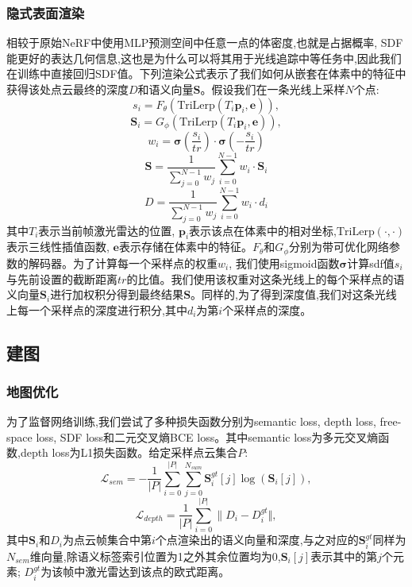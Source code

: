 \subsubsection{隐式表面渲染}
相较于原始NeRF中使用MLP预测空间中任意一点的体密度,也就是占据概率, SDF能更好的表达几何信息,这也是为什么可以将其用于光线追踪中等任务中,因此我们在训练中直接回归SDF值。下列渲染公式表示了我们如何从嵌套在体素中的特征中获得该处点云最终的深度$D$和语义向量$\mathbf{S}$。假设我们在一条光线上采样$N$个点:
\begin{equation}
    s_i=F_\theta(\mbox{TriLerp}(T_i\mathbf{p}_i,\mathbf{e})),
\end{equation}
\begin{equation}
    \mathbf{S}_i=G_\phi(\mbox{TriLerp}(T_i\mathbf{p}_i,\mathbf{e})),
\end{equation}
\begin{equation}
    w_i=\mathbf{\sigma}(\frac{s_i}{tr})\cdot\mathbf{\sigma}(-\frac{s_i}{tr})
\end{equation}
\begin{equation}
    \mathbf{S} = \frac{1}{\sum_{j=0}^{N-1}w_j}\sum_{i=0}^{N-1}w_i\cdot\mathbf{S}_i
\end{equation}
\begin{equation}
    D = \frac{1}{\sum_{j=0}^{N-1}w_j}\sum_{i=0}^{N-1}w_i\cdot d_i
\end{equation}
其中$T_i$表示当前帧激光雷达的位置, $\mathbf{p}_i$表示该点在体素中的相对坐标,$\mbox{TriLerp}(\cdot , \cdot)$表示三线性插值函数, $\mathbf{e}$表示存储在体素中的特征。$F_\theta\mbox{和}G_\phi$分别为带可优化网络参数的解码器。为了计算每一个采样点的权重$w_i$, 我们使用sigmoid函数$\mathbf{\sigma}$计算sdf值$s_i$与先前设置的截断距离$tr$的比值。我们使用该权重对这条光线上的每个采样点的语义向量$\mathbf{S}_i$进行加权积分得到最终结果$\mathbf{S}$。同样的,为了得到深度值,我们对这条光线上每一个采样点的深度进行积分,其中$d_i$为第$i$个采样点的深度。
\subsection{建图}
\subsubsection{地图优化}
为了监督网络训练,我们尝试了多种损失函数分别为semantic loss, depth loss, free-space loss, SDF loss和二元交叉熵BCE loss。其中semantic loss为多元交叉熵函数,depth loss为L1损失函数。给定采样点云集合$P$:
\begin{equation}
    \mathcal{L}_{sem} = -\frac{1}{|P|}\sum_{i=0}^{|P|}\sum_{j=0}^{N_{sum}}\mathbf{S}_i^{gt}[j]\log(\mathbf{S}_i[j]),
\end{equation}
\begin{equation}
    \mathcal{L}_{depth} = \frac{1}{|P|}\sum_{i=0}^{|P|}\| D_i-D_i^{gt}\Vert ,
\end{equation}
其中$\mathbf{S}_i$和$D_i$为点云帧集合中第$i$个点渲染出的语义向量和深度,与之对应的$\mathbf{S}_i^{gt}$同样为$N_{sem}$维向量,除语义标签索引位置为1之外其余位置均为0,$\mathbf{S}_i[j]$表示其中的第$j$个元素; $D_i^{gt}$为该帧中激光雷达到该点的欧式距离。 

